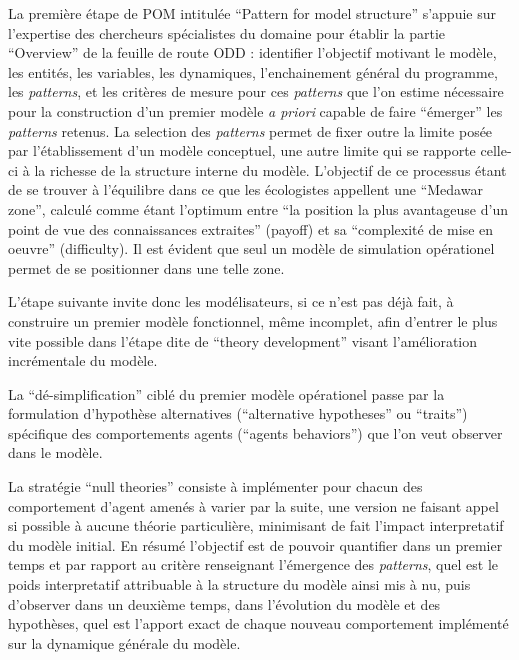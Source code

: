La première étape de POM intitulée \foreignquote{english}{Pattern for model structure} s'appuie sur l'expertise des chercheurs spécialistes du domaine pour établir la partie \foreignquote{english}{Overview} de la feuille de route ODD : identifier l'objectif motivant le modèle, les entités, les variables, les dynamiques, l'enchainement général du programme, les \textit{patterns}, et les critères de mesure pour ces \textit{patterns} que l'on estime nécessaire pour la construction d'un premier modèle \textit{a priori} capable de faire \enquote{émerger} les \textit{patterns} retenus. La selection des \textit{patterns} permet de fixer outre la limite posée par l'établissement d'un modèle conceptuel, une autre limite qui se rapporte celle-ci à la richesse de la structure interne du modèle. L'objectif de ce processus étant de se trouver à l'équilibre dans ce que les écologistes appellent une \enquote{Medawar zone}, calculé comme étant l'optimum entre \enquote{la position la plus avantageuse d'un point de vue des connaissances extraites} (payoff) et sa \enquote{complexité de mise en oeuvre} (difficulty). Il est évident que seul un modèle de simulation opérationel permet de se positionner dans une telle zone. 

L'étape suivante invite donc les modélisateurs, si ce n'est pas déjà fait, à construire un premier modèle fonctionnel, même incomplet, afin d'entrer le plus vite possible dans l'étape dite de \foreignquote{english}{theory development} visant l'amélioration incrémentale du modèle.

La \enquote{dé-simplification} ciblé du premier modèle opérationel passe par la formulation d'hypothèse alternatives (\foreignquote{english}{alternative hypotheses} ou \foreignquote{english}{traits}) spécifique des comportements agents (\foreignquote{english}{agents behaviors}) que l'on veut observer dans le modèle.  

La stratégie \foreignquote{english}{null theories}   consiste à implémenter pour chacun des comportement d'agent amenés à varier par la suite, une version ne faisant appel si possible à aucune théorie particulière, minimisant de fait l'impact interpretatif du modèle initial. En résumé l'objectif est de pouvoir quantifier dans un premier temps et par rapport au critère renseignant l'émergence des \textit{patterns}, quel est le poids interpretatif attribuable à la structure du modèle ainsi mis à nu, puis d'observer dans un deuxième temps, dans l'évolution du modèle et des hypothèses, quel est l'apport exact de chaque nouveau comportement implémenté sur la dynamique générale du modèle.

